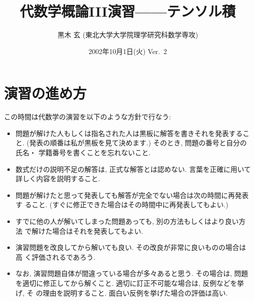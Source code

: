 \documentclass[12pt,twoside]{jarticle}
\begin{document}

\title{\bf 代数学概論III演習——テンソル積}

\author{黒木 玄 \quad (東北大学大学院理学研究科数学専攻)}

\date{2002年10月1日(火) Ver.~2}

\maketitle

\setcounter{page}{1}       %
\setcounter{section}{-1}   %
\setcounter{theorem}{0}    %
\setcounter{question}{0}   %
\setcounter{footnote}{0}   %


\begin{small}
\tableofcontents
\end{small}


\section{演習の進め方}

この時間は代数学の演習を以下のような方針で行なう:
\begin{itemize}
\item 問題が解けた人もしくは指名された人は黒板に解答を書きそれを発表すること.
  (発表の順番は私が黒板を見て決めます.) そのとき, 問題の番号と自分の氏名・
  学籍番号を書くことを忘れないこと.
\item 数式だけの説明不足の解答は, 正式な解答とは認めない. 言葉を正確に用いて
  詳しく内容を説明すること.
\item 問題が解けたと思って発表しても解答が完全でない場合は次の時間に再発表す
  ること.  (すぐに修正できた場合はその時間中に再発表してもよい.)
\item すでに他の人が解いてしまった問題あっても, 別の方法もしくはより良い方法
  で解けた場合はそれを発表してもよい.
\item 演習問題を改良してから解いても良い. その改良が非常に良いものの場合は高
  く評価されるであろう.
\item なお, 演習問題自体が間違っている場合が多々あると思う. その場合は, 問題
  を適切に修正してから解くこと. 適切に訂正不可能な場合は, 反例などを挙げ, そ
  の理由を説明すること. 面白い反例を挙げた場合の評価は高い.
\end{itemize}
\end{document}
